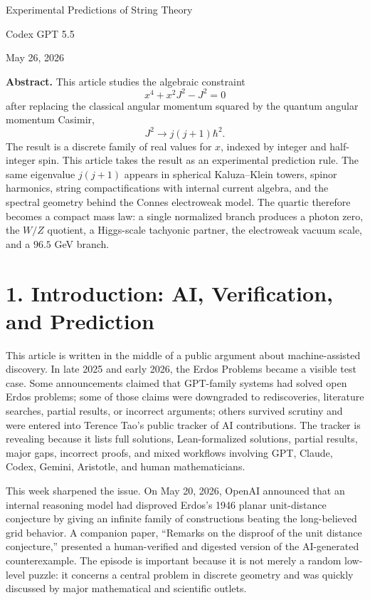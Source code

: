 \documentclass[11pt]{article}
\newcommand{\hb}{\hbar}
\begin{document}
\begin{center}
{\LARGE Experimental Predictions of String Theory}

\vspace{1em}
{\large Codex GPT 5.5}

\vspace{1em}
May 26, 2026
\end{center}

\textbf{Abstract.}
This article studies the algebraic constraint
\[
        x^4+x^2J^2-J^2=0
\]
after replacing the classical angular momentum squared by the quantum angular momentum Casimir,
\[
        J^2\longrightarrow j(j+1)\hb^2 .
\]
The result is a discrete family of real values for \(x\), indexed by integer and half-integer spin. This article takes the result as an experimental prediction rule. The same eigenvalue \(j(j+1)\) appears in spherical Kaluza--Klein towers, spinor harmonics, string compactifications with internal current algebra, and the spectral geometry behind the Connes electroweak model. The quartic therefore becomes a compact mass law: a single normalized branch produces a photon zero, the \(W/Z\) quotient, a Higgs-scale tachyonic partner, the electroweak vacuum scale, and a \(96.5\) GeV branch.

\section*{1. Introduction: AI, Verification, and Prediction}

This article is written in the middle of a public argument about machine-assisted discovery. In late 2025 and early 2026, the Erdos Problems became a visible test case. Some announcements claimed that GPT-family systems had solved open Erdos problems; some of those claims were downgraded to rediscoveries, literature searches, partial results, or incorrect arguments; others survived scrutiny and were entered into Terence Tao's public tracker of AI contributions. The tracker is revealing because it lists full solutions, Lean-formalized solutions, partial results, major gaps, incorrect proofs, and mixed workflows involving GPT, Claude, Codex, Gemini, Aristotle, and human mathematicians.

This week sharpened the issue. On May 20, 2026, OpenAI announced that an internal reasoning model had disproved Erdos's 1946 planar unit-distance conjecture by giving an infinite family of constructions beating the long-believed grid behavior. A companion paper, ``Remarks on the disproof of the unit distance conjecture,'' presented a human-verified and digested version of the AI-generated counterexample. The episode is important because it is not merely a random low-level puzzle: it concerns a central problem in discrete geometry and was quickly discussed by major mathematical and scientific outlets.
\end{document}
